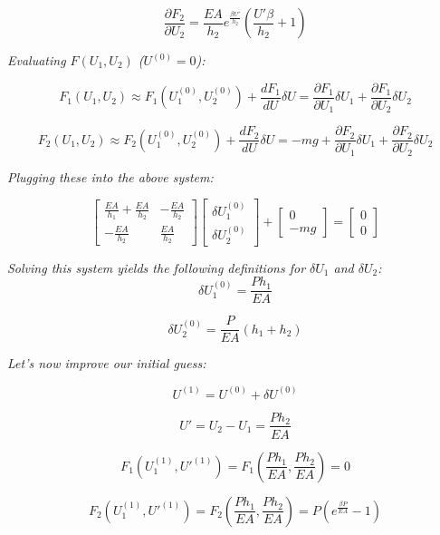 \documentclass[12pt,american]{article}
\def\beq{\begin{equation}}
\def\eeq{\end{equation}}
\begin{document}
\beq
\frac{\partial F_2}{\partial U_2} = \frac{EA}{h_2} e^{\frac{\beta U'}{h_2}} \left( \frac{U' \beta}{h_2} + 1 \right)
\eeq

{\em Evaluating $F(U_1,U_2)$ ($U^{(0)} = 0$):}

\beq
F_1(U_1,U_2) \approx F_1(U_1^{(0)},U_2^{(0)}) + \frac{dF_1}{dU} \delta U = \frac{\partial F_1}{\partial U_1} \delta U_1 + \frac{\partial F_1}{\partial U_2} \delta U_2
\eeq

\beq
F_2(U_1,U_2) \approx F_2(U_1^{(0)},U_2^{(0)}) + \frac{dF_2}{dU} \delta U = -mg + \frac{\partial F_2}{\partial U_1} \delta U_1 + \frac{\partial F_2}{\partial U_2} \delta U_2
\eeq

{\em Plugging these into the above system:}

\beq
\begin{bmatrix}
  \frac{EA}{h_1} + \frac{EA}{h_2} & - \frac{EA}{h_2} \\
- \frac{EA}{h_2} & \frac{EA}{h_2}
\end{bmatrix}
\begin{bmatrix}
\delta U_1^{(0)} \\ \delta U_2^{(0)}
\end{bmatrix} +
\begin{bmatrix}
0 \\ - mg
\end{bmatrix} =
\begin{bmatrix}
0 \\ 0
\end{bmatrix}
\eeq

{\em Solving this system yields the following definitions for $\delta U_1$ and $\delta U_2$:}
\beq
\delta U_1^{(0)} = \frac{Ph_1}{EA}
\eeq

\beq
\delta U_2^{(0)} = \frac{P}{EA} (h_1+h_2)
\eeq

{\em Let's now improve our initial guess:}

\beq
U^{(1)} = U^{(0)} + \delta U^{(0)}
\eeq

\beq
U' = U_2 - U_1 = \frac{Ph_2}{EA}
\eeq

\beq
F_1 (U_1^{(1)}, U'^{(1)}) = F_1 \left( \frac{Ph_1}{EA},\frac{Ph_2}{EA} \right) = 0
\eeq

\beq
F_2 (U_1^{(1)}, U'^{(1)}) = F_2 \left( \frac{Ph_1}{EA},\frac{Ph_2}{EA} \right) = P \left( e^{\frac{\beta P}{EA}} - 1 \right)
\eeq
\end{document}

